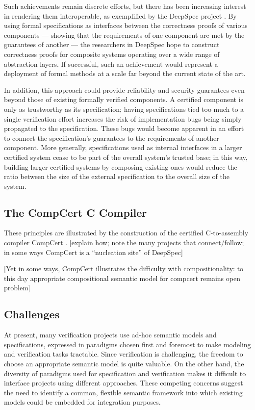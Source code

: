 \documentclass[acmsmall,timestamp,review,anonymous]{acmart}
\begin{document}
Such achievements remain discrete efforts, but
there has been increasing interest in rendering them interoperable,
as exemplified by the DeepSpec project \cite{deepspec}.
By using formal specifications as interfaces
between the correctness proofs of various components ---
showing that the requirements of one component
are met by the guarantees of another ---
the researchers in DeepSpec hope to
construct correctness proofs for composite systems
operating over a wide range of abstraction layers.
If successful,
such an achievement would represent a deployment of formal methods
at a scale far beyond the current state of the art.

In addition,
this approach could provide reliability and security guarantees
even beyond those of existing formally verified components.
A certified component is only as trustworthy as its specification;
having specifications tied too much to a single verification effort
increases the risk of
implementation bugs being simply propagated to
the specification.
These bugs would become apparent in an effort to
connect the specification's guarantees to
the requirements of another component.
More generally,
specifications used as internal interfaces
in a larger certified system cease to be part of
the overall system's trusted base;
in this way,
building larger certified systems
by composing existing ones
would reduce the
ratio between the size of the external specification to
the overall size of the system.


\subsection{The CompCert C Compiler} %

These principles are illustrated by
the construction of the certified C-to-assembly compiler
CompCert \cite{compcert}.
[explain how; note the many projects that connect/follow;
in some ways CompCert is a ``nucleation site'' of DeepSpec]

[Yet in some ways,
CompCert illustrates the difficulty with compositionality:
to this day appropriate compositional semantic model
for compcert remains open problem]


\subsection{Challenges} %

At present, many verification projects
use ad-hoc semantic models and specifications,
expressed in paradigms chosen first and foremost
to make modeling and verification tasks tractable.
Since verification is challenging,
the freedom to choose an appropriate semantic model
is quite valuable.
On the other hand,
the diversity of paradigms used for specification and verification
makes it difficult
to interface projects using different approaches.
These competing concerns
suggest the need to identify a common,
flexible semantic framework
into which existing models could be embedded
for integration purposes.
\end{document}
